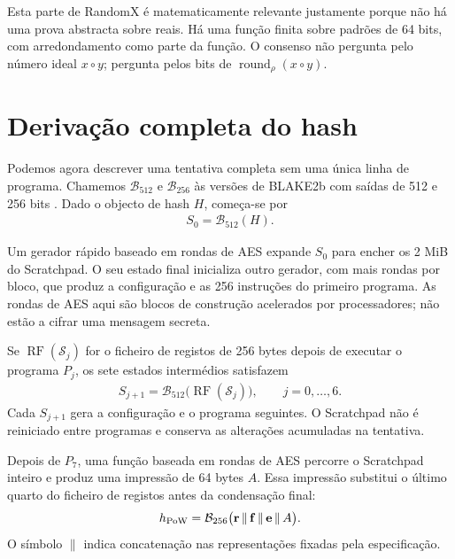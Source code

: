 Esta parte de RandomX é matematicamente relevante justamente porque não há uma
prova abstracta sobre reais. Há uma função finita sobre padrões de 64 bits,
com arredondamento como parte da função. O consenso não pergunta pelo número
ideal \(x\circ y\); pergunta pelos bits de
\(\operatorname{round}_\rho(x\circ y)\).


\section{Derivação completa do hash}
\label{sec:randomx-full-hash}

Podemos agora descrever uma tentativa completa sem uma única linha de
programa. Chamemos \(\mathcal B_{512}\) e \(\mathcal B_{256}\) às versões de
BLAKE2b com saídas de 512 e 256 bits \cite{blake2-paper}. Dado o objecto de
hash \(H\), começa-se por
\begin{align}
 S_0=\mathcal B_{512}(H).
 \label{eq:randomx-initial-seed}
\end{align}

Um gerador rápido baseado em rondas de AES expande \(S_0\) para encher os 2 MiB
do Scratchpad. O seu estado final inicializa outro gerador, com mais rondas por
bloco, que produz a configuração e as 256 instruções do primeiro programa.
As rondas de AES aqui são blocos de construção acelerados por processadores;
não estão a cifrar uma mensagem secreta.

Se \(\operatorname{RF}(\mathcal S_j)\) for o ficheiro de registos de 256 bytes
depois de executar o programa \(P_j\), os sete estados intermédios satisfazem
\begin{align}
 S_{j+1}=\mathcal B_{512}
   \bigl(\operatorname{RF}(\mathcal S_j)\bigr),
 \qquad j=0,\ldots,6.
 \label{eq:randomx-next-program-seed}
\end{align}
Cada \(S_{j+1}\) gera a configuração e o programa seguintes. O Scratchpad não
é reiniciado entre programas e conserva as alterações acumuladas na tentativa.

Depois de \(P_7\), uma função baseada em rondas de AES percorre o Scratchpad
inteiro e produz uma impressão de 64 bytes \(A\). Essa impressão substitui o
último quarto do ficheiro de registos antes da condensação final:
\begin{align}
 h_{\rm PoW}=\mathcal B_{256}
 \bigl(\mathbf r\,\|\,\mathbf f\,\|\,\mathbf e\,\|\,A\bigr).
 \label{eq:randomx-final-hash}
\end{align}
O símbolo \(\|\) indica concatenação nas representações fixadas pela
especificação.

